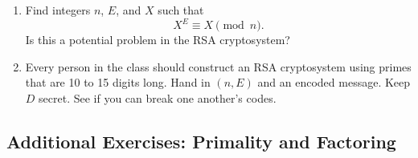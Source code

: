 {\begin{enumerate}
 
\bf\item\rm
Find integers $n$, $E$, and $X$ such that
$$
X^E \equiv X \pmod{n}.
$$
Is this a potential problem in the RSA cryptosystem?
 
 
\bf\item\rm
Every person in the class should construct an RSA cryptosystem using primes
that are 10 to 15 digits long.  Hand in $(n, E)$ and an encoded 
message. Keep $D$ secret. See if you can break one another's codes.
 
 
\end{enumerate}
}
 
 
\subsection*{Additional Exercises: Primality and Factoring}
 
